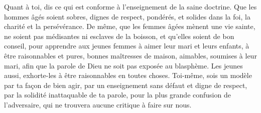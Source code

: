 Quant à toi, dis ce qui est conforme à l’enseignement de la saine doctrine.
Que les hommes âgés soient sobres, dignes de respect, pondérés,
	et solides dans la foi, la charité et la persévérance.
De même, que les femmes âgées mènent une vie sainte,
	ne soient pas médisantes ni esclaves de la boisson,
	et qu’elles soient de bon conseil,
	pour apprendre aux jeunes femmes à aimer leur mari et leurs enfants,
	à être raisonnables et pures, bonnes maîtresses de maison,
	aimables, soumises à leur mari,
	afin que la parole de Dieu ne soit pas exposée au blasphème.
Les jeunes aussi, exhorte-les à être raisonnables en toutes choses.
Toi-même, sois un modèle par ta façon de bien agir,
	par un enseignement sans défaut et digne de respect,
	par la solidité inattaquable de ta parole,
	pour la plus grande confusion de l’adversaire,
	qui ne trouvera aucune critique à faire sur nous.
